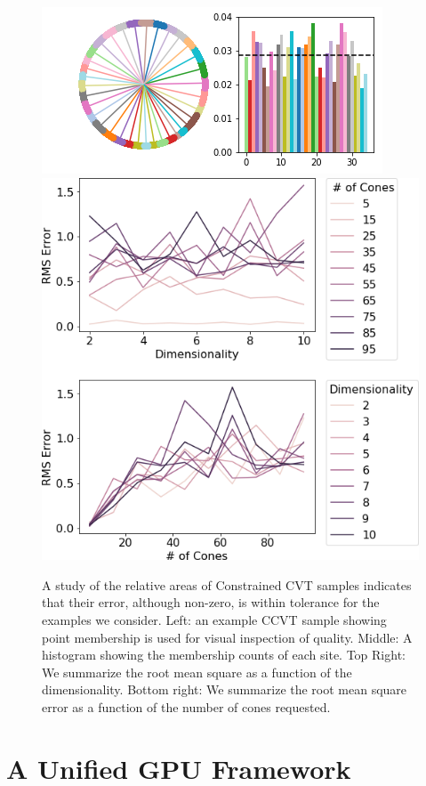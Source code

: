 \begin{figure}[htbp]
    \includegraphics[width=0.65\linewidth]{figs/chap7/cvt_study_35.png}
    \includegraphics[width=0.32\linewidth]{figs/chap7/scvt.png}
    \caption{A study of the relative areas of Constrained CVT samples indicates that their error, although non-zero, is within tolerance for the examples we consider.
    Left: an example CCVT sample showing point membership is used for visual inspection of quality.
    Middle: A histogram showing the membership counts of each site.
    Top Right: We summarize the root mean square as a function of the dimensionality.
    Bottom right: We summarize the root mean square error as a function of the number of cones requested.}
    \label{fig:cvt_study}
\end{figure}


\section{A Unified GPU Framework}
\label{sec:gpu_graphs}

